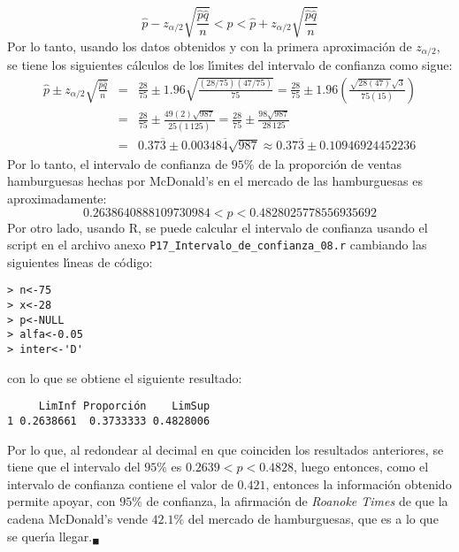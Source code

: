 \begin{solucion}
 \begin{equation*}
  \hat{p} - z_{\alpha/2}\sqrt{\frac{\hat{p}\hat{q}}{n}} < p < \hat{p} + z_{\alpha/2}\sqrt{\frac{\hat{p}\hat{q}}{n}}
 \end{equation*}
 Por lo tanto, usando los datos obtenidos y con la primera aproximaci\'on de $z_{\alpha/2}$, se tiene los siguientes c\'alculos de los l\'{\i}mites del intervalo de confianza como sigue:
 \begin{eqnarray*}
  \hat{p} \pm z_{\alpha/2}\sqrt{\frac{\hat{p}\hat{q}}{n}} & = & \frac{28}{75} \pm 1.96\sqrt{\frac{\left( 28/75 \right)\left( 47/75 \right)}{75}} = \frac{28}{75} \pm 1.96\left( \frac{\sqrt{28(47)}\sqrt{3}}{75(15)} \right) \\
  & = & \frac{28}{75} \pm \frac{49(2)\sqrt{987}}{25(1\,125)} = \frac{28}{75} \pm \frac{98\sqrt{987}}{28\,125} \\
  & = & 0.37\overline{3} \pm 0.00348\overline{4}\sqrt{987} \approx 0.37\overline{3} \pm 0.10946924452236
 \end{eqnarray*}
 Por lo tanto, el intervalo de confianza de $95\%$ de la proporci\'on de ventas hamburguesas hechas por McDonald's en el mercado de las hamburguesas es aproximadamente:
 \begin{equation*}
  0.2638640888109730984 < p < 0.4828025778556935692
 \end{equation*}
 Por otro lado, usando R, se puede calcular el intervalo de confianza usando el script en el archivo anexo \texttt{P17\_Intervalo\_de\_confianza\_08.r} cambiando las siguientes l\'{\i}neas de c\'odigo:
 \begin{verbatim}
> n<-75
> x<-28
> p<-NULL
> alfa<-0.05
> inter<-'D'
 \end{verbatim}
 \vspace{-0.5cm}
 con lo que se obtiene el siguiente resultado:
 \begin{verbatim}
     LimInf Proporción    LimSup
1 0.2638661  0.3733333 0.4828006
 \end{verbatim}
 \vspace{-0.5cm}
 Por lo que, al redondear al decimal en que coinciden los resultados anteriores, se tiene que el intervalo del $95\%$ es $0.2639 < p < 0.4828$, luego entonces, como el intervalo de confianza contiene el valor de $0.421$, entonces la informaci\'on obtenido permite apoyar, con $95\%$ de confianza, la afirmaci\'on de \textit{Roanoke Times} de que la cadena McDonald's vende $42.1\%$ del mercado de hamburguesas, que es a lo que se quer\'{\i}a llegar.${}_{\blacksquare}$
\end{solucion}
